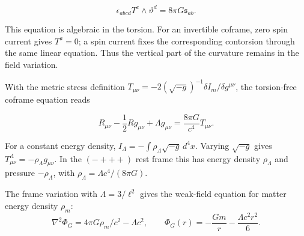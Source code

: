 \documentclass[aps,prx,onecolumn,10pt,notitlepage,nofootinbib,longbibliography]{revtex4-2}
\numberwithin{equation}{section}
\numberwithin{table}{section}
\begin{document}
\begin{equation}
 \epsilon_{abcd}T^c\wedge \vartheta^d=8\pi G\mathfrak s_{ab}.
 \label{eq:proof-SE-7}
\end{equation}

This equation is algebraic in the torsion. For an invertible coframe, zero spin current gives \(T^a=0\); a spin current fixes the corresponding contorsion through the same linear equation. Thus the vertical part of the curvature remains in the field variation.

With the metric stress definition \(T_{\mu\nu}=-2(\sqrt{-g})^{-1}\delta I_m/\delta g^{\mu\nu}\), the torsion-free coframe equation reads

\begin{equation}
 R_{\mu\nu}-\frac12Rg_{\mu\nu}+\Lambda g_{\mu\nu}
       =\frac{8\pi G}{c^4}T_{\mu\nu}.
 \label{eq:proof-SE-8}
\end{equation}

For a constant energy density, \(I_\Lambda=-\int\rho_\Lambda\sqrt{-g}\,d^4x\). Varying \(\sqrt{-g}\) gives \(T_{\mu\nu}^\Lambda=-\rho_\Lambda g_{\mu\nu}\). In the \((-+++)\) rest frame this has energy density \(\rho_\Lambda\) and pressure \(-\rho_\Lambda\), with \(\rho_\Lambda=\Lambda c^4/(8\pi G)\).

The frame variation with $\Lambda=3/\ell^2$ gives the weak-field equation for matter energy density $\rho_m$:
\begin{equation}
 \nabla^2\Phi_G=4\pi G\rho_m/c^2-\Lambda c^2,\qquad
 \Phi_G(r)=-\frac{Gm}{r}-\frac{\Lambda c^2r^2}{6}.
 \label{eq:weakfieldgravity}
\end{equation}
\end{document}
